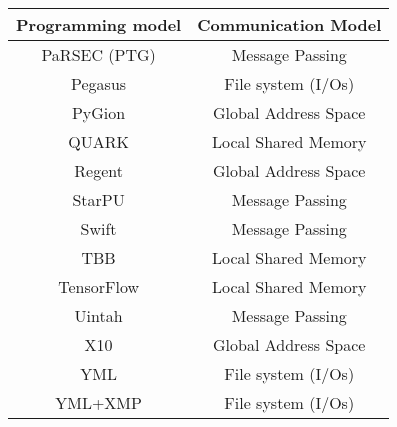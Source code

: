 \begin{tabular}{cc}
\hline
Programming model & Communication Model \\
\hline
PaRSEC (PTG) & Message Passing\\
Pegasus & File system (I/Os)\\
PyGion & Global Address Space\\
QUARK & Local Shared Memory\\
Regent & Global Address Space\\
StarPU & Message Passing\\
Swift & Message Passing\\
TBB & Local Shared Memory\\
TensorFlow & Local Shared Memory\\
Uintah & Message Passing\\
X10 & Global Address Space\\
YML & File system (I/Os)\\
YML+XMP & File system (I/Os)\\
\hline
\end{tabular}
